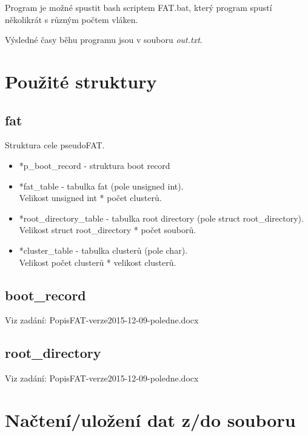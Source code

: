 Program je možné spustit bash scriptem FAT.bat, který program spustí několikrát s různým počtem vláken.

Výsledné časy běhu programu jsou v souboru \emph{out.txt}.


\chapter{Použité struktury}

\section{fat}

Struktura cele pseudoFAT.

\begin{itemize}
	\item *p\_boot\_record - struktura boot record
	\item *fat\_table - tabulka fat (pole unsigned int).\\Velikost unsigned int * počet clusterů.
	\item *root\_directory\_table - tabulka root directory (pole struct root\_directory).\\Velikost struct root\_directory * počet souborů.
	\item *cluster\_table - tabulka clusterů (pole char).\\Velikost počet clusterů * velikost clusterů.
\end{itemize}


\section{boot\_record}

Viz zadání: PopisFAT-verze2015-12-09-poledne.docx

\section{root\_directory}

Viz zadání: PopisFAT-verze2015-12-09-poledne.docx


\chapter{Načtení/uložení dat z/do souboru}

